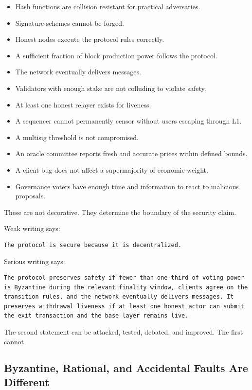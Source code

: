 \begin{itemize}
\tightlist
\item
  Hash functions are collision resistant for practical adversaries.
\item
  Signature schemes cannot be forged.
\item
  Honest nodes execute the protocol rules correctly.
\item
  A sufficient fraction of block production power follows the protocol.
\item
  The network eventually delivers messages.
\item
  Validators with enough stake are not colluding to violate safety.
\item
  At least one honest relayer exists for liveness.
\item
  A sequencer cannot permanently censor without users escaping through
  L1.
\item
  A multisig threshold is not compromised.
\item
  An oracle committee reports fresh and accurate prices within defined
  bounds.
\item
  A client bug does not affect a supermajority of economic weight.
\item
  Governance voters have enough time and information to react to
  malicious proposals.
\end{itemize}

These are not decorative. They determine the boundary of the security
claim.

Weak writing says:

\begin{lstlisting}
The protocol is secure because it is decentralized.
\end{lstlisting}

Serious writing says:

\begin{lstlisting}
The protocol preserves safety if fewer than one-third of voting power is Byzantine during the relevant finality window, clients agree on the transition rules, and the network eventually delivers messages. It preserves withdrawal liveness if at least one honest actor can submit the exit transaction and the base layer remains live.
\end{lstlisting}

The second statement can be attacked, tested, debated, and improved. The
first cannot.

\subsection{Byzantine, Rational, and Accidental Faults Are Different}

